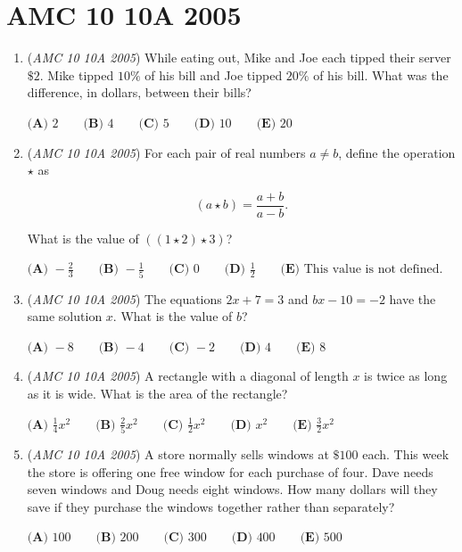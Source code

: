 \section{AMC 10 10A 2005}
        \begin{enumerate}
        	\item (\textit{AMC 10 10A 2005}) While eating out, Mike and Joe each tipped their server $\$2$. Mike tipped $10\%$ of his bill and Joe tipped $20\%$ of his bill. What was the difference, in dollars, between their bills? 


 $\textbf{(A) } 2\qquad \textbf{(B) } 4\qquad \textbf{(C) } 5\qquad \textbf{(D) } 10\qquad \textbf{(E) } 20$


	\item (\textit{AMC 10 10A 2005}) For each pair of real numbers $a \neq b$, define the operation $\star$ as


 
 \[(a \star b) = \frac{a+b}{a-b}.\]


 What is the value of $\left(\left(1 \star 2\right) \star 3\right)$?


 $\textbf{(A) } -\frac{2}{3}\qquad \textbf{(B) } -\frac{1}{5}\qquad \textbf{(C) } 0\qquad \textbf{(D) } \frac{1}{2}\qquad \textbf{(E) } \text{This value is not defined.}$


	\item (\textit{AMC 10 10A 2005}) The equations $2x + 7 = 3$ and $bx - 10 = -2$ have the same solution $x$. What is the value of $b$? 


 $\textbf{(A) } -8\qquad \textbf{(B) } -4\qquad \textbf{(C) } -2\qquad \textbf{(D) } 4\qquad \textbf{(E) } 8$


	\item (\textit{AMC 10 10A 2005}) A rectangle with a diagonal of length $x$ is twice as long as it is wide. What is the area of the rectangle? 


 $\textbf{(A) } \frac{1}{4}x^2\qquad \textbf{(B) } \frac{2}{5}x^2\qquad \textbf{(C) } \frac{1}{2}x^2\qquad \textbf{(D) } x^2\qquad \textbf{(E) } \frac{3}{2}x^2$


	\item (\textit{AMC 10 10A 2005}) A store normally sells windows at $\$100$ each. This week the store is offering one free window for each purchase of four. Dave needs seven windows and Doug needs eight windows. How many dollars will they save if they purchase the windows together rather than separately?


 $\textbf{(A) } 100\qquad \textbf{(B) } 200\qquad \textbf{(C) } 300\qquad \textbf{(D) } 400\qquad \textbf{(E) } 500$



\end{enumerate}
